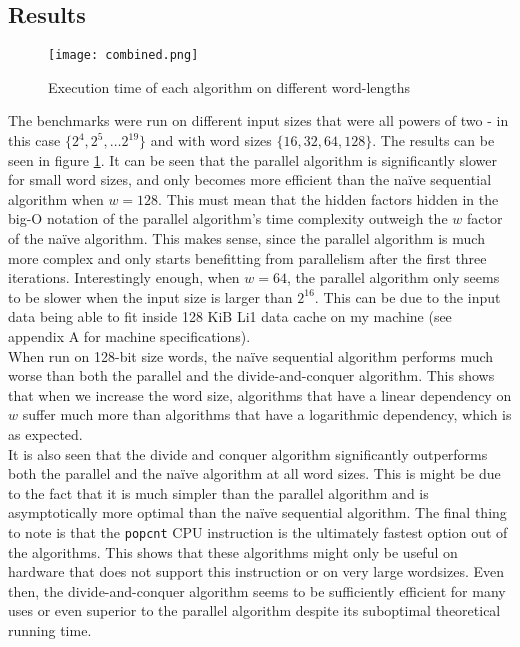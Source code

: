 \subsection{Results}
\begin{figure}
    \centering
    \texttt{[image: combined.png]}
    \caption{Execution time of each algorithm on different word-lengths}
    \label{fig:runningtime}
\end{figure}
The benchmarks were run on different input sizes that were all powers of two - in this case $\{2^4, 2^5, \dots 2^{19}\}$ and with word sizes $\{16, 32, 64, 128\}$. The results can be seen in figure \ref{fig:runningtime}. 
It can be seen that the parallel algorithm is significantly slower for small word sizes, and only becomes more efficient than the naïve sequential algorithm when $w=128$. This must mean that the hidden factors hidden in the big-O notation of the parallel algorithm's time complexity outweigh the $w$ factor of the naïve algorithm. This makes sense, since the parallel algorithm is much more complex and only starts benefitting from parallelism after the first three iterations. Interestingly enough, when $w=64$, the parallel algorithm only seems to be slower when the input size is larger than $2^{16}$. This can be due to the input data being able to fit inside 128 KiB Li1 data cache on my machine (see appendix A for machine specifications).\\
When run on 128-bit size words, the naïve sequential algorithm performs much worse than both the parallel and the divide-and-conquer algorithm. This shows that when we increase the word size, algorithms that have a linear dependency on $w$ suffer much more than algorithms that have a logarithmic dependency, which is as expected.\\
It is also seen that the divide and conquer algorithm significantly outperforms both the parallel and the naïve algorithm at all word sizes. This is might be due to the fact that it is much simpler than the parallel algorithm and is asymptotically more optimal than the naïve sequential algorithm.
The final thing to note is that the \texttt{popcnt} CPU instruction is the ultimately fastest option out of the algorithms. This shows that these algorithms might only be useful on hardware that does not support this instruction or on very large wordsizes. Even then, the divide-and-conquer algorithm seems to be sufficiently efficient for many uses or even superior to the parallel algorithm despite its suboptimal theoretical running time.\\

